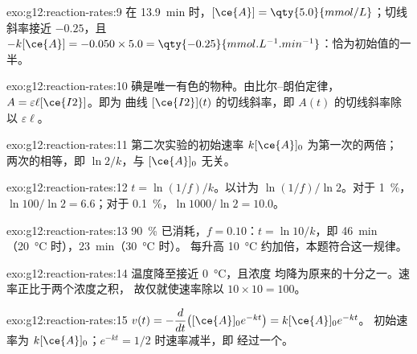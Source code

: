 \begin{solution}{exo:g12:reaction-rates:9}
在 \qty{13.9}{min} 时，$[\ce{A}] = \qty{5.0}{mmol/L}$；切线斜率接近
$-0.25$，且 $-k[\ce{A}] = -0.050 \times 5.0 =
\qty{-0.25}{mmol.L^{-1}.min^{-1}}$：恰为初始值的一半。
\end{solution}

\begin{solution}{exo:g12:reaction-rates:10}
碘是唯一有色的物种。由比尔–朗伯定律，
$A = \varepsilon \ell [\ce{I2}]$。即为
曲线 $[\ce{I2}](t)$ 的切线斜率，即
$A(t)$ 的切线斜率除以 $\varepsilon \ell$。
\end{solution}

\begin{solution}{exo:g12:reaction-rates:11}
第二次实验的初始速率 $k[\ce{A}]_0$ 为第一次的两倍；
两次的相等，即 $\ln 2 / k$，与 $[\ce{A}]_0$ 无关。
\end{solution}

\begin{solution}{exo:g12:reaction-rates:12}
$t = \ln(1/f)/k$。以计为 $\ln(1/f)/\ln 2$。对于 \qty{1}{\percent}，
$\ln 100 / \ln 2 = 6.6$；对于 \qty{0.1}{\percent}，$\ln 1000 / \ln 2 =
10.0$。
\end{solution}

\begin{solution}{exo:g12:reaction-rates:13}
\qty{90}{\percent} 已消耗，$f = 0.10$：$t = \ln 10 / k$，即
\qty{46}{min}（\qty{20}{\celsius} 时），\qty{23}{min}（\qty{30}{\celsius} 时）。
每升高 \qty{10}{\celsius} 约加倍，本题符合这一规律。
\end{solution}

\begin{solution}{exo:g12:reaction-rates:14}
温度降至接近 \qty{0}{\celsius}，且浓度
均降为原来的十分之一。速率正比于两个浓度之积，
故仅就使速率除以 $10 \times 10 = 100$。
\end{solution}

\begin{solution}{exo:g12:reaction-rates:15}
$v(t) = -\dfrac{d}{dt}\big([\ce{A}]_0 e^{-kt}\big) = k[\ce{A}]_0 e^{-kt}$。
初始速率为 $k[\ce{A}]_0$；$e^{-kt} = 1/2$ 时速率减半，即
经过一个。
\end{solution}

